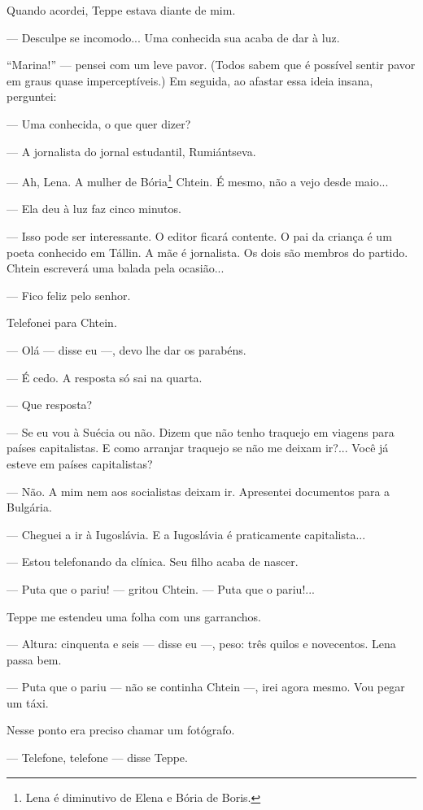 Quando acordei, Teppe estava diante de mim.

--- Desculpe se incomodo... Uma conhecida sua acaba de dar à luz.

``Marina!'' --- pensei com um leve pavor. (Todos sabem que é possível
sentir pavor em graus quase imperceptíveis.) Em seguida, ao afastar essa
ideia insana, perguntei:

--- Uma conhecida, o que quer dizer?

--- A jornalista do jornal estudantil, Rumiántseva.

--- Ah, Lena. A mulher de Bória\footnote{Lena é diminutivo de Elena e
  Bória de Boris.} Chtein. É mesmo, não a vejo desde maio...

--- Ela deu à luz faz cinco minutos.

--- Isso pode ser interessante. O editor ficará contente. O pai da
criança é um poeta conhecido em Tállin. A mãe é jornalista. Os dois são
membros do partido. Chtein escreverá uma balada pela ocasião...

--- Fico feliz pelo senhor.

Telefonei para Chtein.

--- Olá --- disse eu ---, devo lhe dar os parabéns.

--- É cedo. A resposta só sai na quarta.

--- Que resposta?

--- Se eu vou à Suécia ou não. Dizem que não tenho traquejo em viagens
para países capitalistas. E como arranjar traquejo se não me deixam
ir?... Você já esteve em países capitalistas?

--- Não. A mim nem aos socialistas deixam ir. Apresentei documentos para
a Bulgária.

--- Cheguei a ir à Iugoslávia. E a Iugoslávia é praticamente
capitalista...

--- Estou telefonando da clínica. Seu filho acaba de nascer.

--- Puta que o pariu! --- gritou Chtein. --- Puta que o pariu!...

Teppe me estendeu uma folha com uns garranchos.

--- Altura: cinquenta e seis --- disse eu ---, peso: três quilos e
novecentos. Lena passa bem.

--- Puta que o pariu --- não se continha Chtein ---, irei agora mesmo.
Vou pegar um táxi.

Nesse ponto era preciso chamar um fotógrafo.

--- Telefone, telefone --- disse Teppe.

